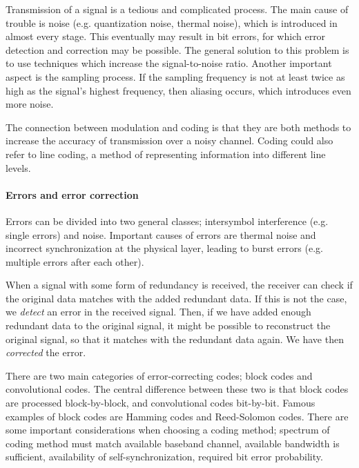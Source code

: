 \documentclass[11pt,titlepage]{report}
\begin{document}
Transmission of a signal is a tedious and complicated process. The main cause of trouble is noise (e.g. quantization noise, thermal noise), which is introduced in almost every stage. This eventually may result in bit errors, for which error detection and correction may be possible. The general solution to this problem is to use techniques which increase the signal-to-noise ratio. Another important aspect is the sampling process. If the sampling frequency is not at least twice as high as the signal's highest frequency, then aliasing occurs, which introduces even more noise.

The connection between modulation and coding is that they are both methods to increase the accuracy of transmission over a noisy channel. Coding could also refer to line coding, a method of representing information into different line levels.

\paragraph{Errors and error correction}
Errors can be divided into two general classes; intersymbol interference (e.g. single errors) and noise. Important causes of errors are thermal noise and incorrect synchronization at the physical layer, leading to burst errors (e.g. multiple errors after each other).

When a signal with some form of redundancy is received, the receiver can check if the original data matches with the added redundant data. If this is not the case, we \emph{detect} an error in the received signal. Then, if we have added enough redundant data to the original signal, it might be possible to reconstruct the original signal, so that it matches with the redundant data again. We have then \emph{corrected} the error.

There are two main categories of error-correcting codes; block codes and convolutional codes. The central difference between these two is that block codes are processed block-by-block, and convolutional codes bit-by-bit. Famous examples of block codes are Hamming codes and Reed-Solomon codes. There are some important considerations when choosing a coding method; spectrum of coding method must match available baseband channel, available bandwidth is sufficient, availability of self-synchronization, required bit error probability. 
\end{document}
